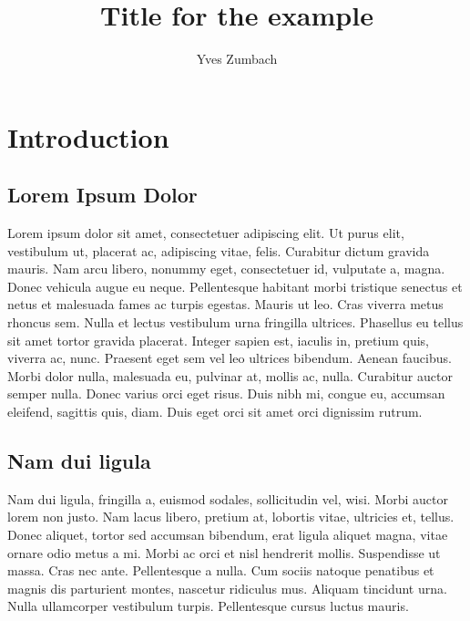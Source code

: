 \documentclass{yMemoir}
\author{Yves Zumbach}
\title{Title for the example}
\begin{document}
	
	\chapter{Introduction}
	\section{Lorem Ipsum Dolor}
	Lorem ipsum dolor sit amet, consectetuer adipiscing elit. Ut purus elit,
	vestibulum ut, placerat ac, adipiscing vitae, felis. Curabitur dictum gravida
	mauris. Nam arcu libero, nonummy eget, consectetuer id, vulputate a, magna.
	Donec vehicula augue eu neque. Pellentesque habitant morbi tristique
	senectus et netus et malesuada fames ac turpis egestas\sidenote{\lipsum[3]}. Mauris ut leo.
	Cras viverra metus rhoncus sem. Nulla et lectus vestibulum urna fringilla
	ultrices. Phasellus eu tellus sit amet tortor gravida placerat. Integer sapien
	est, iaculis in, pretium quis, viverra ac, nunc. Praesent eget sem vel leo ultrices bibendum. Aenean faucibus. Morbi dolor nulla, malesuada eu, pulvinar
	at, mollis ac, nulla. Curabitur auctor semper nulla. Donec varius orci eget
	risus. Duis nibh mi, congue eu, accumsan eleifend, sagittis quis, diam. Duis
	eget orci sit amet orci dignissim rutrum.
	
	\section{Nam dui ligula}
	
	Nam dui ligula, fringilla a, euismod sodales, sollicitudin vel, wisi. Morbi auctor lorem non justo. Nam lacus libero, pretium at, lobortis vitae, ultricies et, tellus. Donec aliquet, tortor sed accumsan bibendum, erat ligula aliquet magna, vitae ornare odio metus a mi. Morbi ac orci et nisl hendrerit mollis. Suspendisse ut massa. Cras nec ante. Pellentesque a nulla. Cum sociis natoque penatibus et magnis dis parturient montes, nascetur ridiculus mus. Aliquam tincidunt urna. Nulla ullamcorper vestibulum turpis. Pellentesque cursus luctus mauris.
	
\end{document}
